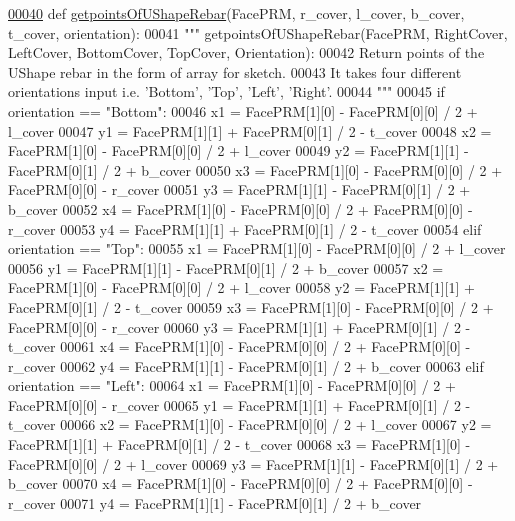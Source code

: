 \begin{DoxyCode}
\hypertarget{namespaceUShapeRebar.tex_l00040}{}\hyperlink{namespaceUShapeRebar_ac12ae9bce6b5211759f2fff4091b0221}{00040} \textcolor{keyword}{def }\hyperlink{namespaceUShapeRebar_ac12ae9bce6b5211759f2fff4091b0221}{getpointsOfUShapeRebar}(FacePRM, r\_cover, l\_cover, b\_cover, t\_cover, orientation):
00041     \textcolor{stringliteral}{""" getpointsOfUShapeRebar(FacePRM, RightCover, LeftCover, BottomCover, TopCover, Orientation):}
00042 \textcolor{stringliteral}{    Return points of the UShape rebar in the form of array for sketch.}
00043 \textcolor{stringliteral}{    It takes four different orientations input i.e. 'Bottom', 'Top', 'Left', 'Right'.}
00044 \textcolor{stringliteral}{    """}
00045     \textcolor{keywordflow}{if} orientation == \textcolor{stringliteral}{"Bottom"}:
00046         x1 = FacePRM[1][0] - FacePRM[0][0] / 2 + l\_cover
00047         y1 = FacePRM[1][1] + FacePRM[0][1] / 2 - t\_cover
00048         x2 = FacePRM[1][0] - FacePRM[0][0] / 2 + l\_cover
00049         y2 = FacePRM[1][1] - FacePRM[0][1] / 2 + b\_cover
00050         x3 = FacePRM[1][0] - FacePRM[0][0] / 2 + FacePRM[0][0] - r\_cover
00051         y3 = FacePRM[1][1] - FacePRM[0][1] / 2 + b\_cover
00052         x4 = FacePRM[1][0] - FacePRM[0][0] / 2 + FacePRM[0][0] - r\_cover
00053         y4 = FacePRM[1][1] + FacePRM[0][1] / 2 - t\_cover
00054     \textcolor{keywordflow}{elif} orientation == \textcolor{stringliteral}{"Top"}:
00055         x1 = FacePRM[1][0] - FacePRM[0][0] / 2 + l\_cover
00056         y1 = FacePRM[1][1] - FacePRM[0][1] / 2 + b\_cover
00057         x2 = FacePRM[1][0] - FacePRM[0][0] / 2 + l\_cover
00058         y2 = FacePRM[1][1] + FacePRM[0][1] / 2 - t\_cover
00059         x3 = FacePRM[1][0] - FacePRM[0][0] / 2 + FacePRM[0][0] - r\_cover
00060         y3 = FacePRM[1][1] + FacePRM[0][1] / 2 - t\_cover
00061         x4 = FacePRM[1][0] - FacePRM[0][0] / 2 + FacePRM[0][0] - r\_cover
00062         y4 = FacePRM[1][1] - FacePRM[0][1] / 2 + b\_cover
00063     \textcolor{keywordflow}{elif} orientation == \textcolor{stringliteral}{"Left"}:
00064         x1 = FacePRM[1][0] - FacePRM[0][0] / 2 + FacePRM[0][0] - r\_cover
00065         y1 = FacePRM[1][1] + FacePRM[0][1] / 2 - t\_cover
00066         x2 = FacePRM[1][0] - FacePRM[0][0] / 2 + l\_cover
00067         y2 = FacePRM[1][1] + FacePRM[0][1] / 2 - t\_cover
00068         x3 = FacePRM[1][0] - FacePRM[0][0] / 2 + l\_cover
00069         y3 = FacePRM[1][1] - FacePRM[0][1] / 2 + b\_cover
00070         x4 = FacePRM[1][0] - FacePRM[0][0] / 2 + FacePRM[0][0] - r\_cover
00071         y4 = FacePRM[1][1] - FacePRM[0][1] / 2 + b\_cover

\end{DoxyCode}
